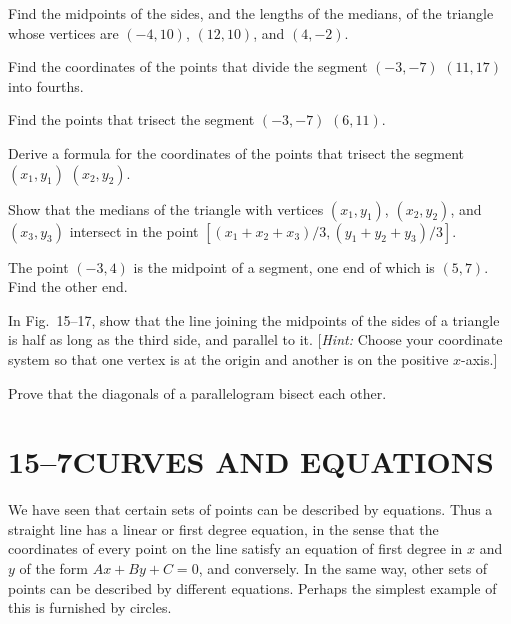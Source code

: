 \documentclass[11pt]{book}
\theoremstyle{bkplain}
\begin{document}
\begin{exercisecols}
\begin{exlist}
\item Find the midpoints of the sides, and the lengths of the medians, of the
  triangle whose vertices are $(-4, 10)$, $(12, 10)$, and $(4, -2)$.
\item Find the coordinates of the points that divide the segment $(-3, -7)$
  $(11, 17)$ into fourths.
\item[\stex 3.] Find the points that trisect the segment $(-3, -7)$
  $(6, 11)$.
\item[\stex 4.] Derive a formula for the coordinates of the points that
  trisect the segment $(x_1, y_1)$ $(x_2, y_2)$.
\item[\stex 5.] Show that the medians of the triangle with vertices
  $(x_1, y_1)$, $(x_2, y_2)$, and $(x_3, y_3)$ intersect in the point
  $[(x_1 + x_2 + x_3)/3, (y_1 + y_2 + y_3)/3]$.
\item[6.] The point $(-3, 4)$ is the midpoint of a segment, one end of which
  is $(5, 7)$. Find the other end.
\item[\stex 7.] In Fig.~15--17, show that the line joining the midpoints of
  the sides of a triangle is half as long as the third side, and parallel to
  it. [\emph{Hint:} Choose your coordinate system so that one vertex is at the
  origin and another is on the positive $x$-axis.]
\exfig{\FIGXVSEVENTEEN}
\item[\stex 8.] Prove that the diagonals of a parallelogram bisect each
  other.
\end{exlist}
\end{exercisecols}

\section*{15--7\quad CURVES AND EQUATIONS}

We have seen that certain sets of points can be described by equations. Thus a
straight line has a linear or first degree equation, in the sense that the
coordinates of every point on the line satisfy an equation of first degree in
$x$ and $y$ of the form $Ax + By + C = 0$, and conversely. In the same way,
other sets of points can be described by different equations. Perhaps the
simplest example of this is furnished by circles.
\end{document}
